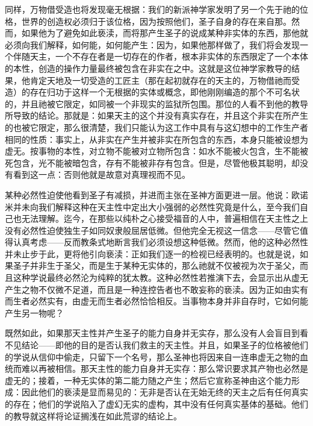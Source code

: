 同样，万物借受造也将发现毫无根据：我们的新派神学家发明了另一个先于祂的位格，世界的创造权必须归于该位格，因为按照他们，圣子自身的存在来自那。然而，如果他为了避免如此亵渎，而将那产生圣子的说成某种非实体的东西，那他就必须向我们解释，如何能，如何能产生：因为，如果他那样做了，我们将会发现一个伴随天主，一个不存在者是一切存在的作者，根本非实体的东西限定了一个本体的本性，创造的操作力量最终被包含在非实在之中。这就是这位神学家教导的结果，他肯定天地及一切受造的工匠主（那在起初就存在的天主的，万物借祂而受造）的存在归功于这样一个无根据的实体或概念，即他刚刚编造的那个不可名状的，并且祂被它限定，如同被一个非现实的监狱所包围。那位的人看不到他的教导所导致的结论。那就是：如果天主的这个并没有真实存在，并且这个非实在所产生的也被它限定，那么很清楚，我们只能认为这工作中具有与这幻想中的工作生产者相同的性质：事实上，从非实在产生并被非实在所包含的东西，本身只能被设想为虚无。按事物的本性，对立物不能被对立物所包含：如水不能被火包含，生不能被死包含，光不能被暗包含，存有不能被非存有包含。但是，尽管他极其聪明，却没有看到这一点：否则他就是故意对真理视而不见。\par

某种必然性迫使他看到圣子有减损，并进而主张在圣神方面更进一层。他说：欧诺米并未向我们解释这种在天主性中定出大小强弱的必然性究竟是什么，至今我们自己也无法理解。迄今，在那些以纯朴之心接受福音的人中，普遍相信在天主性之上没有必然性迫使独生子如同奴隶般屈居低微。但他完全无视这一信念——尽管它值得认真考虑——反而教条式地断言我们必须设想这种低微。然而，他的这种必然性并未止步于此，更将他引向亵渎：正如我们逐一的检视已经表明的。也就是说，如果圣子并非生于圣父，而是生于某种无实体的，那么祂就不仅被视为次于圣父，而且这种学说最终必然沦为纯粹的犹太教。这种必然性若推演下去，会显示出从虚无产生之物不仅微不足道，而且是一种连控告者也不敢妄称的亵渎。因为正如由实有而生者必然实有，由虚无而生者必然恰恰相反。当事物本身并非自存时，它如何能产生另一物呢？\par

既然如此，如果那天主性并产生圣子的能力自身并无实存，那么没有人会盲目到看不见结论——即他的目的是否认我们救主的天主性。并且，如果圣子的位格被他们的学说从信仰中偷走，只留下一个名号，那么圣神也将因来自一连串虚无之物的血统而难以再被相信。那天主性的能力自身并无实存：那么常识要求其产物也必然是虚无的；接着，一种无实体的第二能力随之产生；然后它宣称圣神由这个能力形成：因此他们的亵渎是显而易见的：无非是否认在无始无终的天主之后有任何真实的存在；他们的学说陷入了虚幻无实的虚构，其中没有任何真实基体的基础。他们的教导就这样将论证搁浅在如此荒谬的结论上。\par

